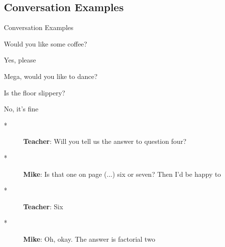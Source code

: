 \subsection{Conversation Examples}
\begin{frame}{Conversation Examples}
\begin{multicols}{2}
	\begin{description}
		\item Would you like some coffee?
		\item [*] Yes, please
		\item Mega, would you like to dance?
		\item [*] Is the floor slippery?
		\item [*]No, it's fine
	\end{description}
	\vfill
	\begin{description}
		\item [*]\textbf{Teacher}: Will you tell us the answer to question
		four?
		\item [*] \textbf{Mike}: Is that one on page (...) six or seven? Then I'd be happy to
		\item [*] \textbf{Teacher}: Six
		\item [*] \textbf{Mike}: Oh, okay. The answer is factorial two
	\end{description}
\end{multicols}

\end{frame}

